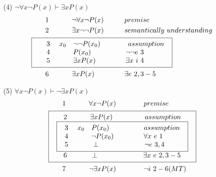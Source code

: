 \documentclass[a4paper,10pt]{article}
\begin{document}
\begin{enumerate}
	\item[(4)]	%
		$\lnot\forall x\lnot P(x)\vdash\exists x P(x)$ \\
	\begin{align*}
		&\quad\quad 1\ \quad\quad\quad \lnot\forall x\lnot P(x) \quad\quad\quad premise \\
		&\quad\quad 2\ \quad\quad\quad \exists x\lnot\lnot P(x) \quad\quad\quad semantically\ understanding \\
		&\fbox{
			$\begin{array}{l}
			\quad 3\ \quad x_0 \quad \lnot\lnot P(x_0) \quad\quad\quad\quad assumption\\
			\quad 4\ \quad\quad\quad P(x_0) \quad\quad\quad\quad\quad \lnot\lnot e\ 3 \\
			\quad 5\ \quad\quad\quad \exists x P(x) \ \quad\quad\quad\quad \exists x\ i\ 4 \\
	 		\end{array}$
 		} \\
 		&\quad\quad 6\ \quad\quad\quad \exists x P(x) \ \quad\quad\quad\quad \exists e\ 2,3-5 \\
	\end{align*}
	
	\item[(5)]	%
		$\forall x\lnot P(x)\vdash\lnot\exists x P(x)$ \\
	\begin{align*}
		&\quad\quad 1\ \quad\quad\quad \forall x\lnot P(x) \quad\quad\quad\quad premise \\
		&\fbox{
			$\begin{array}{l}
			\quad 2\ \quad\quad\quad \exists x P(x) \ \ \quad\quad\quad\quad assumption \\
	 			\fbox{
	 				$\begin{array}{l}
					3\ \quad x_0 \quad P(x_0) \quad\quad\quad\quad\quad assumption\\
					4\ \quad\quad\quad \lnot P(x_0) \ \quad\quad\quad\quad \forall x\ e\ 1 \\
					5\ \quad\quad\quad \perp \ \quad\quad\quad\quad\quad\quad \lnot e\ 3,4 \\
		 			\end{array}$
				} \\
			\quad 6\ \quad\quad\quad \perp \ \quad\quad\quad\quad\quad\quad \exists x\ e\ 2,3-5 \\
	 		\end{array}$
 		} \\
 		&\quad\quad 7\ \quad\quad\quad \lnot\exists x P(x) \quad\quad\quad\quad \lnot i\ 2-6(MT) \\
	\end{align*}
\end{enumerate}
\end{document}
